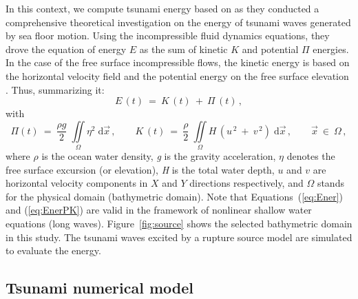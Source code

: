 \documentclass[12pt]{llncs}
\begin{document}
In this context, we compute tsunami energy based on \cite{Dutykh2009b} as they conducted a comprehensive theoretical investigation on the energy of tsunami waves generated by sea floor motion. Using the incompressible fluid dynamics equations, they drove the equation of energy $E$ as the sum of kinetic $K$ and potential $\Pi$ energies. In the case of the free surface incompressible flows, the kinetic energy is based on the horizontal velocity field and the potential energy on the free surface elevation \citep{Dutykh2012a}. Thus, summarizing it:
\begin{equation} \label{eq:Ener}
  E\,(t)\ =\ K\,(t)\ +\ \Pi\,(t)\,,
\end{equation}
with
\begin{equation} \label{eq:EnerPK}
  \Pi(t)\ =\ \frac{\rho g}{2}\;\iint\limits_{\Omega}\eta^{2}\;\mathrm{d}\vec{x}\,,\qquad 
  K\,(t)\ =\ \frac{\rho}{2}\;\iint\limits_{\Omega} H\,(u^{\,2}\ +\ v^{\,2})\;\mathrm{d}\vec{x}\,, \qquad \vec{x}\ \in\ \Omega\,,
\end{equation}
where $\rho$ is the ocean water density, \textit{g} is the gravity acceleration, $\eta$ denotes the free surface excursion (or elevation), \textit{H} is the total water depth, $u$ and $v$ are horizontal velocity components in $X$ and $Y$ directions respectively, and $\Omega$ stands for the physical domain (bathymetric domain). Note that Equations~(\ref{eq:Ener}) and (\ref{eq:EnerPK}) are valid in the framework of nonlinear shallow water equations (long waves). Figure~\ref{fig:source} shows the selected bathymetric domain in this study. The tsunami waves excited by a rupture source model are simulated to evaluate the energy.    

\subsection{Tsunami numerical model}
\end{document}
